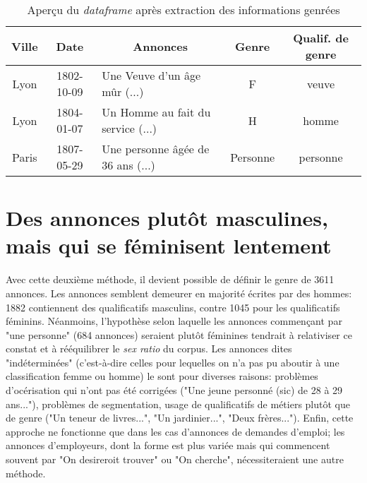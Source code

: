 \begin{table}[h]
	\centering
		\begin{tabular}{cclcc}
			\hline
			\textbf{Ville} & \textbf{Date} & \multicolumn{1}{c}{\textbf{Annonces}}                                                                                                                                                                                                                                                                        & \multicolumn{1}{c}{\textbf{Genre}} & \multicolumn{1}{c}{\textbf{Qualif. de genre}} \\ \hline
			Lyon           & 1802-10-09            & Une Veuve d'un âge mûr (...) & F                         & veuve                                      \\ 
			Lyon           & 1804-01-07        & Un Homme au fait du service (...)                                                                                                          & H                         & homme                                    \\ 
			Paris          & 1807-05-29      & Une personne âgée de 36 ans (...)                                                                                                        & Personne                  & personne                                  \\ \hline
		\end{tabular}
	\caption{Aperçu du \textit{dataframe} après extraction des informations genrées}
\end{table}

\section{Des annonces plutôt masculines, mais qui se féminisent lentement}

Avec cette deuxième méthode, il devient possible de définir le genre de 3611 annonces. Les annonces semblent demeurer en majorité écrites par des hommes:  1882 contiennent des qualificatifs masculins, contre 1045 pour les qualificatifs féminins. Néanmoins, l'hypothèse selon laquelle les annonces commençant par "une personne" (684 annonces) seraient plutôt féminines tendrait à relativiser ce constat et à rééquilibrer le \textit{sex ratio} du corpus. Les annonces dites "indéterminées" (c'est-à-dire celles pour lequelles on n'a pas pu aboutir à une classification femme ou homme) le sont pour diverses raisons: problèmes d'océrisation qui n'ont pas été corrigées ("Une jeune personné (sic) de 28 à 29 ans..."), problèmes de segmentation, usage de qualificatifs de métiers plutôt que de genre ("Un teneur de livres...", "Un jardinier...", "Deux frères..."). Enfin, cette approche ne fonctionne que dans les cas d'annonces de demandes d'emploi; les annonces d'employeurs, dont la forme est plus variée mais qui commencent souvent par "On desireroit trouver" ou "On cherche", nécessiteraient une autre méthode. 

